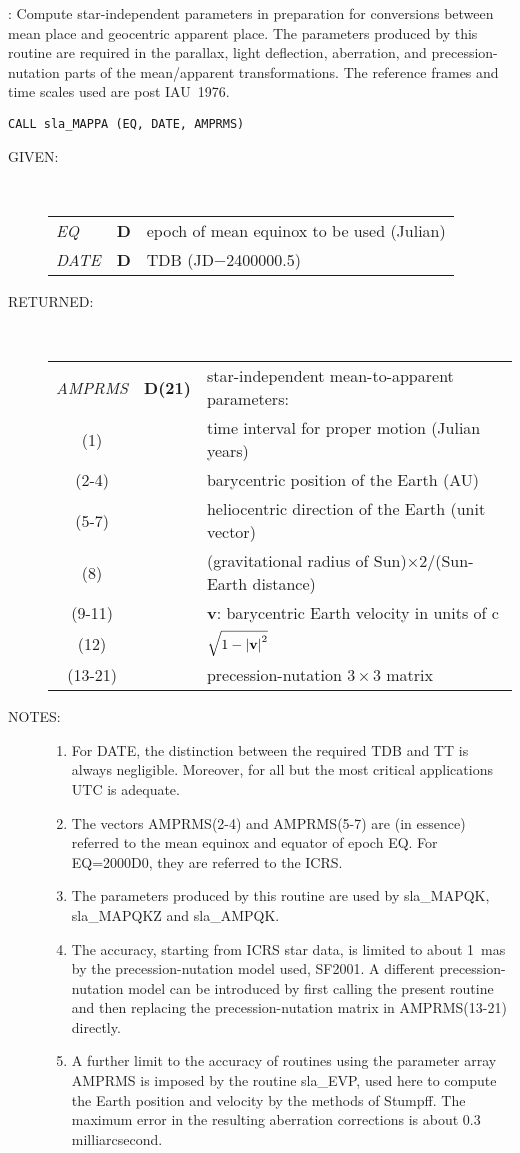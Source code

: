 \documentclass[11pt,twoside]{article}
\newcommand{\action}[1]
{\item[ACTION]: #1}
\newcommand{\action}[1]
   {\item[ACTION:] #1}
\newcommand{\call}[1]
{\item[CALL]: \hspace{0.4em}{\tt #1}}
\newlength{\oldspacing}
\renewcommand{\call}[1]
   {
    \item[CALL:] {\tt #1}
   }
\newcommand{\args}[2]
{
  \goodbreak
  \setlength{\oldspacing}{\topsep}
  \setlength{\topsep}{0.3ex}
  \begin{description}
  \item[#1]:\\[1.5ex]
    \begin{tabular}{p{7em}p{6em}p{22em}}
      #2
    \end{tabular}
  \end{description}
  \setlength{\topsep}{\oldspacing}
}
\renewcommand{\args}[2]
   {
     \begin{description}
        \item[#1:]\\
        \begin{tabular}{p{7em}p{6em}l}
           #2
        \end{tabular}
     \end{description}
   }
\newcommand{\spec}[3]
{
  {\em {#1}} & {\bf \mbox{#2}} & {#3}
}
\newcommand{\specel}[2]
{
  \multicolumn{1}{c}{#1} & {} & {#2}
}
\newcommand{\notes}[1]
{
  \goodbreak
  \setlength{\oldspacing}{\topsep}
  \setlength{\topsep}{0.3ex}
  \begin{description}
    \item[NOTES]:
        #1
  \end{description}
  \setlength{\topsep}{\oldspacing}
}
\renewcommand{\notes}[1]
   {
      \begin{description}
         \item[NOTES:]
            #1
      \end{description}
   }
\begin{document}
{
 \action{Compute star-independent parameters in preparation for
         conversions between mean place and geocentric apparent place.
         The parameters produced by this routine are required in the
         parallax, light deflection, aberration, and precession-nutation
         parts of the mean/apparent transformations.
         The reference frames and time scales used are post IAU~1976.}
 \call{CALL sla\_MAPPA (EQ, DATE, AMPRMS)}
}
\args{GIVEN}
{
 \spec{EQ}{D}{epoch of mean equinox to be used (Julian)} \\
 \spec{DATE}{D}{TDB (JD$-$2400000.5)}
}
\args{RETURNED}
{
 \spec{AMPRMS}{D(21)}{star-independent mean-to-apparent parameters:} \\
 \specel   {(1)}     {time interval for proper motion (Julian years)} \\
 \specel   {(2-4)}   {barycentric position of the Earth (AU)} \\
 \specel   {(5-7)}   {heliocentric direction of the Earth (unit vector)} \\
 \specel   {(8)}     {(gravitational radius of
                      Sun)$\times 2 / $(Sun-Earth distance)} \\
 \specel   {(9-11)}  {{\bf v}: barycentric Earth velocity in units of c} \\
 \specel   {(12)}    {$\sqrt{1-\left|\mbox{\bf v}\right|^2}$} \\
 \specel   {(13-21)} {precession-nutation $3\times3$ matrix}
}
\notes
{
 \begin{enumerate}
  \item For DATE, the distinction between the required TDB and TT
        is always negligible.  Moreover, for all but the most
        critical applications UTC is adequate.
  \item The vectors AMPRMS(2-4) and AMPRMS(5-7) are
        (in essence) referred to
        the mean equinox and equator of epoch EQ.  For
        EQ=2000D0, they are referred to the ICRS.
  \item The parameters produced by this routine are used by
        sla\_MAPQK, sla\_MAPQKZ and sla\_AMPQK.
  \item The accuracy, starting from ICRS star data,
        is limited to about 1~mas by the precession-nutation
        model used, SF2001.  A different precession-nutation model
        can be introduced by first calling the present routine
        and then replacing the precession-nutation
        matrix in AMPRMS(13-21) directly.
  \item A further limit to the accuracy of routines using the
        parameter array AMPRMS is
        imposed by the routine sla\_EVP, used here to compute the
        Earth position and velocity by the methods of Stumpff.
        The maximum error in the resulting aberration corrections is
        about 0.3 milliarcsecond.
 \end{enumerate}
}
\end{document}
